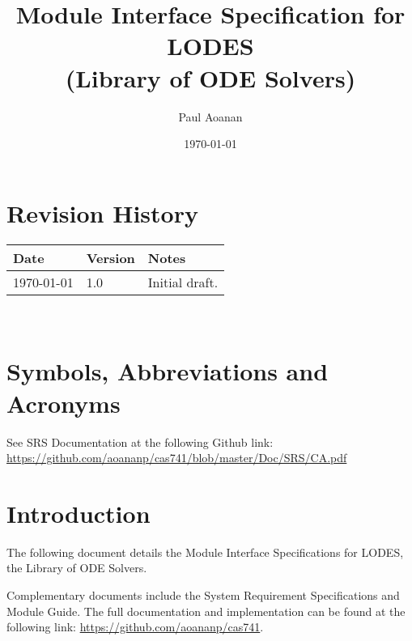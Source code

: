 \documentclass[12pt, titlepage]{article}
\newcommand{\progname}{LODES}
\newcommand{\progdesc}{Library of ODE Solvers}
\begin{document}
\title{Module Interface Specification for \progname{}\\ (\progdesc{})}

\author{Paul Aoanan}

\date{\today}

\maketitle


\section{Revision History}

\begin{tabularx}{\textwidth}{p{3cm}p{2cm}X}
\toprule {\bf Date} & {\bf Version} & {\bf Notes}\\
\midrule
\today{} & 1.0 & Initial draft.\\
\bottomrule
\end{tabularx}

~\newpage

\section{Symbols, Abbreviations and Acronyms}

See SRS Documentation at the following Github link:\\
\url{https://github.com/aoananp/cas741/blob/master/Doc/SRS/CA.pdf}


\newpage

\tableofcontents

\newpage


\section{Introduction}

The following document details the Module Interface Specifications for
\progname{}, the \progdesc{}.

Complementary documents include the System Requirement Specifications
and Module Guide.  The full documentation and implementation can be
found at the following link: \url{https://github.com/aoananp/cas741}. 
\end{document}
